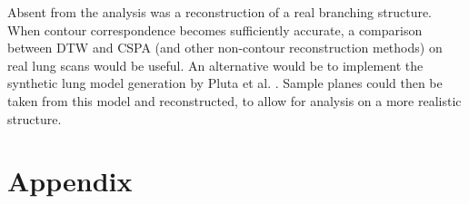 \documentclass[11p, titlepage]{article}
\begin{document}
Absent from the analysis was a reconstruction of a real branching structure. When contour correspondence becomes sufficiently accurate, a comparison between DTW and CSPA (and other non-contour reconstruction methods) on real lung scans would be useful. An alternative would be to implement the synthetic lung model generation by Pluta et al. \cite{pluta2012new}. Sample planes could then be taken from this model and reconstructed, to allow for analysis on a more realistic structure.

\pagebreak



\section{Appendix}
\end{document}
